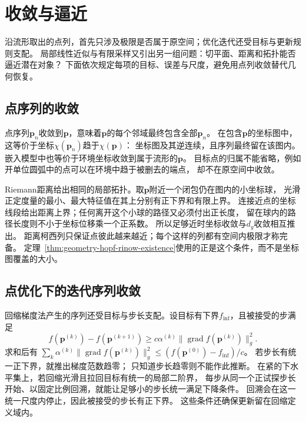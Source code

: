 \section{收敛与逼近}
\label{sec:geometry-convergence-approximation}

沿流形取出的点列，首先只涉及极限是否属于原空间；优化迭代还受目标与更新规则支配。
局部线性近似与有限采样又引出另一组问题：切平面、距离和拓扑能否逼近潜在对象？
下面依次规定每项的目标、误差与尺度，避免用点列收敛替代几何恢复。

\subsection{点序列的收敛}
\label{sec:geometry-point-convergence}

点序列$\bm p_n$收敛到$\bm p$，意味着$\bm p$的每个邻域最终包含全部$\bm p_n$。
在包含$\bm p$的坐标图中，这等价于坐标$\chi(\bm p_n)$趋于$\chi(\bm p)$：
坐标图及其逆连续，且序列最终留在该图内。嵌入模型中也等价于环境坐标收敛到属于流形的$\bm p$。
目标点的归属不能省略，例如开单位圆弧中的点可以在环境中趋于被删去的端点，
却不在原空间中收敛。

Riemann距离给出相同的局部拓扑。取$\bm p$附近一个闭包仍在图内的小坐标球，
光滑正定度量的最小、最大特征值在其上分别有正下界和有限上界。
连接近点的坐标线段给出距离上界；任何离开这个小球的路径又必须付出正长度，
留在球内的路径长度则不小于坐标位移乘一个正系数。
所以足够近时坐标收敛与$d_g$收敛相互推出。
距离柯西列只保证点彼此越来越近；每个这样的列都有空间内极限才称完备。
定理~\ref{thm:geometry-hopf-rinow-existence}使用的正是这个条件，而不是坐标图覆盖的大小。

\subsection{点优化下的迭代序列收敛}
\label{sec:geometry-point-iteration-convergence}

回缩梯度法产生的序列还受目标与步长支配。设目标有下界$f_{\inf}$，且被接受的步满足
\[
 f(\bm p^{(k)})-f(\bm p^{(k+1)})\geq
 c\alpha^{(k)}\lVert\operatorname{grad}f(\bm p^{(k)})\rVert_g^2.
\]
求和后有
$\sum_k\alpha^{(k)}\lVert\operatorname{grad}f(\bm p^{(k)})\rVert_g^2
\leq(f(\bm p^{(0)})-f_{\inf})/c$。
若步长有统一正下界，就推出梯度范数趋零；
只知道步长趋零则不能作此推断。
在紧的下水平集上，若回缩光滑且拉回目标有统一的局部二阶界，
每步从同一个正试探步长开始、以固定比例回溯，就能让足够小的步长统一满足下降条件。
回溯会在这一统一尺度内停止，因此被接受的步长有正下界。
这些条件还确保更新留在回缩定义域内。

